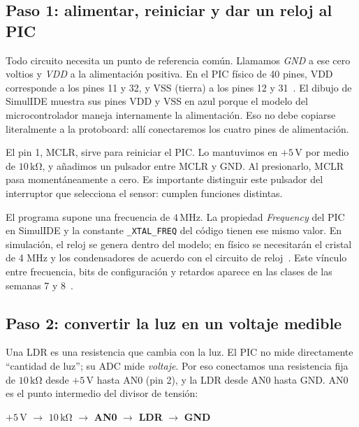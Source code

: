 \documentclass[11pt,a4paper]{article}
\begin{document}
\subsection{Paso 1: alimentar, reiniciar y dar un reloj al PIC}

Todo circuito necesita un punto de referencia común. Llamamos \emph{GND} a ese cero voltios y \emph{VDD} a la alimentación positiva. En el PIC físico de 40 pines, VDD corresponde a los pines 11 y 32, y VSS (tierra) a los pines 12 y 31~\cite{pic}. El dibujo de SimulIDE muestra sus pines VDD y VSS en azul porque el modelo del microcontrolador maneja internamente la alimentación. Eso no debe copiarse literalmente a la protoboard: allí conectaremos los cuatro pines de alimentación.

El pin 1, MCLR, sirve para reiniciar el PIC. Lo mantuvimos en \(+5\,\mathrm V\) por medio de \(10\,\mathrm{k\Omega}\), y añadimos un pulsador entre MCLR y GND. Al presionarlo, MCLR pasa momentáneamente a cero. Es importante distinguir este pulsador del interruptor que selecciona el sensor: cumplen funciones distintas.

El programa supone una frecuencia de \(4\,\mathrm{MHz}\). La propiedad \emph{Frequency} del PIC en SimulIDE y la constante \texttt{\_XTAL\_FREQ} del código tienen ese mismo valor. En simulación, el reloj se genera dentro del modelo; en físico se necesitarán el cristal de 4 MHz y los condensadores de acuerdo con el circuito de reloj~\cite{simulide,pic}. Este vínculo entre frecuencia, bits de configuración y retardos aparece en las clases de las semanas 7 y 8~\cite{clasepic,claseconfig}.

\subsection{Paso 2: convertir la luz en un voltaje medible}

Una LDR es una resistencia que cambia con la luz. El PIC no mide directamente ``cantidad de luz''; su ADC mide \emph{voltaje}. Por eso conectamos una resistencia fija de \(10\,\mathrm{k\Omega}\) desde \(+5\,\mathrm V\) hasta AN0 (pin 2), y la LDR desde AN0 hasta GND. AN0 es el punto intermedio del divisor de tensión:

\begin{center}
\colorbox{gris}{\parbox{0.8\linewidth}{\centering
\(+5\,\mathrm V\) $\longrightarrow$ \(10\,\mathrm{k\Omega}\) $\longrightarrow$
\textbf{AN0} $\longrightarrow$ \textbf{LDR} $\longrightarrow$ \textbf{GND}}}
\end{center}
\end{document}
